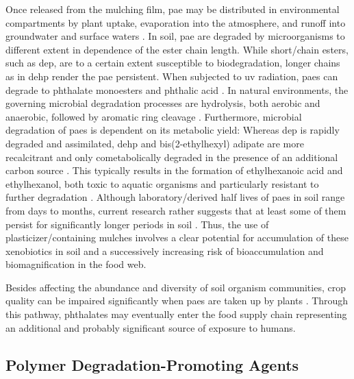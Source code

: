 Once released from the mulching film, \ac{pae} may be distributed in environmental compartments by plant uptake, evaporation into the atmosphere, and runoff into groundwater and surface waters \citep{HeContamination2014}. In soil, \ac{pae} are degraded by microorganisms to different extent in dependence of the ester chain length. While short\-/chain esters, such as \ac{dep}, are to a certain extent susceptible to biodegradation, longer chains as in \ac{dehp} render the \ac{pae} persistent. When subjected to \ac{uv} radiation, \acp{pae} can degrade to phthalate monoesters and phthalic acid \citep{HankettMolecular2013}. In natural environments, the governing microbial degradation processes are hydrolysis, both aerobic and anaerobic, followed by aromatic ring cleavage \citep{MagdouliDi2013,StaplesEnvironmental1997}. Furthermore, microbial degradation of \acp{pae} is dependent on its metabolic yield: Whereas \ac{dep} is rapidly degraded and assimilated, \ac{dehp} and bis(2-ethylhexyl) adipate are more recalcitrant and only cometabolically degraded in the presence of an additional carbon source \citep{CartwrightDegradation2000,NalliBiodegradation2002}. This typically results in the formation of ethylhexanoic acid and ethylhexanol, both toxic to aquatic organisms and particularly resistant to further degradation \citep{HornPlasticizer2004}. Although laboratory\-/derived half lives of \acp{pae} in soil range from days to months, current research rather suggests that at least some of them persist for significantly longer periods in soil \citep{RudelDegradation1993}. Thus, the use of plasticizer\-/containing mulches involves a clear potential for accumulation of these xenobiotics in soil and a successively increasing risk of bioaccumulation and biomagnification in the food web.

Besides affecting the abundance and diversity of soil organism communities, crop quality can be impaired significantly when \acp{pae} are taken up by plants \citep{KapanenPerformance2008,WangOccurrence2015}. Through this pathway, phthalates may eventually enter the food supply chain representing an additional and probably significant source of exposure to humans.

\subsection{Polymer Degradation-Promoting Agents}
\label{sec:plastic-mulching:oxodegradation}

